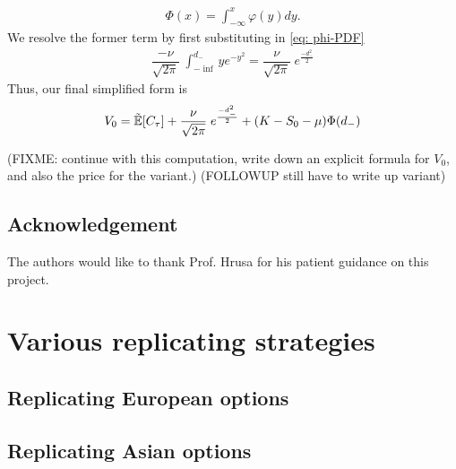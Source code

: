 \documentclass[reqno]{amsart}
\begin{document}
\begin{align}
     \Phi(x) = \int_{-\infty}^x \varphi(y) dy.
\end{align}
We resolve the former term by first substituting in \eqref{eq: phi-PDF}
\begin{align}
     \dfrac{-\nu}{\sqrt{2\pi}} \;\int_{-\inf}^{d_{-}} ye^{-y^2} = \dfrac{\nu}{\sqrt{2\pi}} \;e^{\frac{-d_-^2}{2}}
\end{align}
Thus, our final simplified form is
\begin{align}
     V_0 = \tilde{\mathbb{E}}[C_\tau] + \dfrac{\nu}{\sqrt{2\pi}} \;e^{\frac{-d_-^2}{2}} +  (K- S_0 - \mu) \Phi(d_-) 
\end{align}

(FIXME: continue with this computation, write down an explicit formula for $V_0$, and also the price for the variant.) (FOLLOWUP still have to write up variant)

\subsection*{Acknowledgement} The authors would like to thank Prof. Hrusa for his patient guidance on this project.  


\appendix
\section{Various replicating strategies}

\subsection{Replicating European options}

\subsection{Replicating Asian options}

\end{document}
